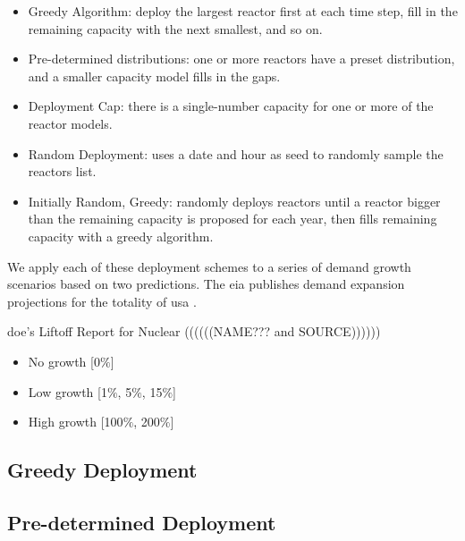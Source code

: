 \begin{itemize}
    \item Greedy Algorithm: deploy the largest reactor first at each time step, fill in the remaining capacity with the next smallest, and so on.
    \item Pre-determined distributions: one or more reactors have a preset distribution, and a smaller capacity model fills in the gaps.
    \item Deployment Cap: there is a single-number capacity for one or more of the reactor models.
    \item Random Deployment: uses a date and hour as seed to randomly sample the reactors list.
    \item Initially Random, Greedy: randomly deploys reactors until a reactor bigger than the remaining capacity is proposed for each year, then fills remaining capacity with a greedy algorithm.
\end{itemize}

We apply each of these deployment schemes to a series of demand growth scenarios based on two predictions. The \gls{eia} publishes demand expansion projections for the totality of \gls{usa} .


\gls{doe}'s Liftoff Report for Nuclear ((((((NAME??? and SOURCE)))))) \cite{}
\begin{itemize}
    \item No growth [0$\%$]
    \item Low growth [1$\%$, 5$\%$, 15$\%$]
    \item High growth [100$\%$, 200$\%$]
\end{itemize}

\subsection{Greedy Deployment}




\subsection{Pre-determined Deployment}




